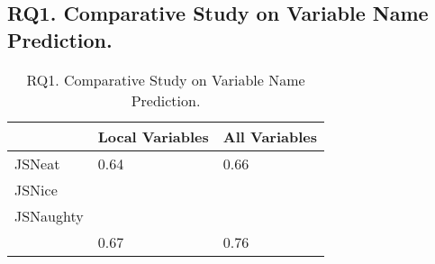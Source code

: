 \subsection{{\bf RQ1. Comparative Study on Variable Name Prediction.}}
\label{empirical-rq1}

\begin{table}[t]
	\caption{RQ1. Comparative Study on Variable Name Prediction.}
	\begin{center}
		\small
		\renewcommand{\arraystretch}{1} 
		\begin{tabular}{p{2cm}<{\centering}|p{2cm}<{\centering}|p{2cm}<{\centering}}
			\hline
		                & Local Variables & All Variables\\
			\hline
			JSNeat      & 0.64            & 0.66    \\
			JSNice      &                 &         \\
			JSNaughty   &                 &         \\
			\hline
			{\tool}     & 0.67            & 0.76    \\
			\hline
		\end{tabular}
		\label{RQ1-result}
	\end{center}
\end{table}
